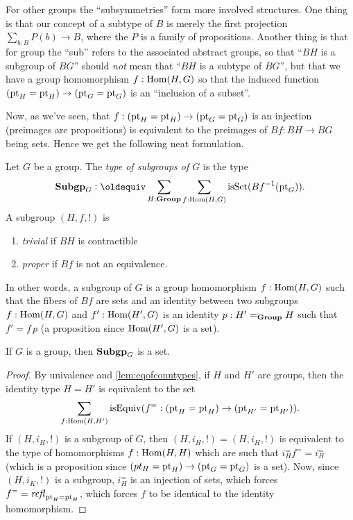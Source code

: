 For other groups the ``subsymmetries'' form more involved structures.  One thing is that our concept of a subtype of $B$ is merely the first projection $\sum_{b:B}P(b)\to B$, where the $P$ is a family of propositions.  Another thing is that for group the ``sub'' refers to the associated abstract groups, so that ``$BH$ is a subgroup of $BG$'' should \emph{not} mean that ``$BH$ is a subtype of $BG$'', but that we have a group homomorphism $f:\mathrm{Hom}(H,G)$ so that the induced function $({\mathord{\mathrm{pt}}}_H={\mathord{\mathrm{pt}}}_H)\to({\mathord{\mathrm{pt}}}_G={\mathord{\mathrm{pt}}}_G)$ is an ``inclusion of a subset''. 

Now, as we've seen, that   $f:({\mathord{\mathrm{pt}}}_H={\mathord{\mathrm{pt}}}_H)\to({\mathord{\mathrm{pt}}}_G={\mathord{\mathrm{pt}}}_G)$ is an injection (preimages are propositions) is equivalent to the preimages of $Bf:BH\to BG$ being sets.  Hence we get the following neat formulation.
    \begin{definition}
      \label{def:subgroup}
      Let $G$ be a group.  
      The \emph{type of subgroups of $G$} is the type
      $$\typesubgroup_G\defequi\sum_{H:\typegroup}\sum_{f:\Hom(H,G)}\isset(Bf^{-1}(\pt_G)).$$
       A subgroup $(H,f,!)$ is
      \begin{enumerate}
      \item \emph{trivial} if $BH$ is contractible
      \item \emph{proper} if $Bf$ is not an equivalence.
      \end{enumerate}
    \end{definition}
In other words, a subgroup of $G$ is a group homomorphism $f:\mathrm{Hom}(H,G)$ such that the fibers of $Bf$ are sets and an identity between two subgroups $f:\mathrm{Hom}(H,G)$ and $f':\mathrm{Hom}(H',G)$ is an identity $p:H'=_{\mathbf{Group}}H$ such that $f'=f\,p$ (a proposition since $\mathrm{Hom}(H',G)$ is a set).
\begin{lemma}
  \label{lem:setofsubgroups}
  If $G$ is a group, then $\mathbf{Subgp}_G$ is a set.
\end{lemma}
\begin{proof}
  By univalence and \cref{lem:eqofconntypes}, if $H$ and $H'$ are groups, then the identity type $H=H'$ is equivalent to the set 
$$\sum_{f:\mathrm{Hom}(H,H')}\mathrm{isEquiv}(f^=:({\mathord{\mathrm{pt}}}_H={\mathord{\mathrm{pt}}}_H)\to({\mathord{\mathrm{pt}}}_{H'}={\mathord{\mathrm{pt}}}_{H'})).$$  If $(H,i_H,!)$ is a subgroup of $G$, then
$(H,i_H,!)=(H,i_H,!)$ is equivalent to the type of homomorphisms $f:\mathrm{Hom}(H,H)$ which are such that $i_H^=f^==i_H^=$ (which is a proposition since ${(pt_H={\mathord{\mathrm{pt}}}_H)\to({\mathord{\mathrm{pt}}}_G={\mathord{\mathrm{pt}}}_G)}$ is a set).  Now, since $(H,i_K,!)$ is a subgroup, $i_H^=$ is an injection of sets, which forces $f^==\mathop{{\it refl}_{{\mathord{\mathrm{pt}}}_H={\mathord{\mathrm{pt}}}_H}}$, which forces $f$ to be identical to the identity homomorphism. 
\end{proof}
